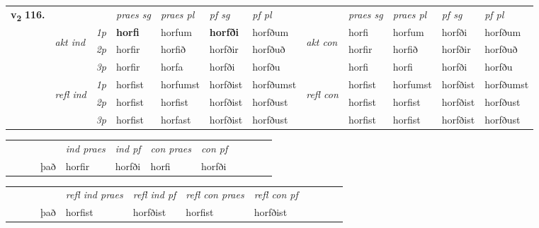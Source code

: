 \begin{tabular}{llllllllllll} \toprule
\multirow{4}{*}{{{\textbf{v{\textsubscript{2}}} \Large{\textbf{116.}}}}}  & &   &  \textit{praes sg}  & \textit{praes pl}  &\textit{ pf sg} & \textit{pf pl} &  &  \textit{praes sg}  & \textit{praes pl}  & \textit{pf sg} & \textit{pf pl } \\*
	\cmidrule{4-7} \cmidrule{9-12}
 & \multirow{3}{*}{\begin{turn}{90}\textit{akt ind}\end{turn}} & {\textit{1p}} & \textbf{horfi} & horfum    & \textbf{horfði} & horfðum & \multirow{3}{*}{\begin{turn}{90}\textit{akt con}\end{turn}} &horfi & horfum & horfði & horfðum\\*
& &  {\textit{2p}} &  horfir  & horfið   & horfðir & horfðuð & & horfir & horfið & horfðir & horfðuð \\*
& &  {\textit{3p}} & horfir & horfa   & horfði & horfðu & & horfi & horfi& horfði & horfðu  \\*
\cmidrule{4-7} \cmidrule{9-12}
 &\multirow{3}{*}{\begin{turn}{90}\textit{refl ind}\end{turn}} & {\textit{1p}} & horfist & horfumst    & horfðist & horfðumst & \multirow{3}{*}{\begin{turn}{90}\textit{refl con}\end{turn}}  &horfist & horfumst & horfðist & horfðumst\\*
 &&  {\textit{2p}} &  horfist  & horfist   & horfðist & horfðust & &horfist & horfist & horfðist & horfðust \\*
& &  {\textit{3p}} & horfist & horfast   & horfðist & horfðust & & horfist & horfist& horfðist & horfðust  \\*
\cmidrule{4-7} \cmidrule{9-12}
\end{tabular}


\begin{tabular}{llllllllllll}
 & &  & &  \textit{ind praes} & \textit{ind pf} & \textit{con praes} & \textit{con pf} \\*
&  & & það & horfir & horfði & horfi & horfði \\*
\cmidrule{5-9}
\end{tabular}


\begin{tabular}{llllllllllll}
 & &  & &  \textit{refl ind praes} & \textit{refl ind pf} & \textit{refl con praes} & \textit{refl con pf} \\*
 & &  & það & horfist & horfðist & horfist & horfðist \\*
\cmidrule{5-9}
\end{tabular}


